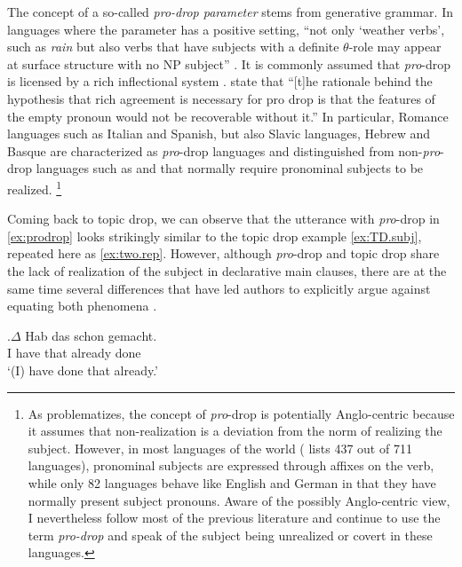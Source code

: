 The concept of a so-called \emph{\emph{pro}-drop parameter} stems from generative grammar. 
In languages where the parameter has a positive setting, ``not only `weather verbs', such as \textit{rain} but also verbs that have subjects with a definite \textit{$\theta$}-role may appear at surface structure with no NP subject'' \citep[28]{chomsky1981}.
It is commonly assumed that \textit{pro}-drop is licensed by a rich inflectional system \citep{taraldsen1980, rizzi1982}.
\citet[82]{ackema.neeleman2007} state that ``[t]he rationale behind the hypothesis that rich agreement is necessary for pro drop is that the features of the empty pronoun would not be recoverable without it.'' 
In particular, Romance languages such as Italian  and Spanish,  but also Slavic languages, Hebrew  and Basque  \citep[see][]{perlmutter1971} are characterized as \textit{pro}-drop languages and distinguished from non-\textit{pro}-drop languages such as  and  that normally require pronominal subjects to be realized.%
\footnote{As \citet{wals-101} problematizes, the concept of \textit{pro}-drop is potentially Anglo-centric because it assumes that non-realization is a deviation from the norm of realizing the subject. 
However, in most languages of the world (\cite{wals-101} lists 437 out of 711 languages), pronominal subjects are expressed through affixes on the verb, while only 82 languages behave like English and German in that they have normally present subject pronouns.
Aware of the possibly Anglo-centric view, I nevertheless follow most of the previous literature and continue to use the term \textit{\emph{pro}-drop} and speak of the subject being unrealized or covert in these languages.}
%

Coming back to topic drop, we can observe that the utterance with \textit{pro}-drop in \ref{ex:prodrop} looks strikingly similar to the topic drop example \ref{ex:TD.subj}, repeated here as \ref{ex:two.rep}.
However, although \textit{pro}-drop and topic drop share the lack of realization of the subject in declarative main clauses, there are at the same time several differences that have led authors to explicitly argue against equating both phenomena \citep[e.g.,][]{fries1988,klein1993,trutkowski2011, volodina2011}.

\exg.\label{ex:two.rep}$\Delta$ Hab das schon gemacht.\\
I have that already done\\
`(I) have done that already.'

